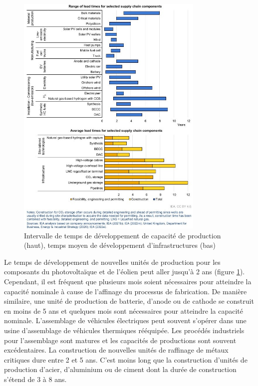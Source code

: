 \begin{figure}[!b]
    \centering
    \includegraphics[width=0.8\textwidth]{Images/supply_chain/time_for_deploying_vis.jpg}
    \caption{Intervalle de temps de développement de capacité de production (haut), temps moyen de développement d'infrastructures (bas)}
    \label{fig:time_supplu}
\end{figure}
Le temps de développement de nouvelles unités de production pour les composants du photovoltaïque et de l'éolien peut aller jusqu'à 2 ans (figure \ref{fig:time_supplu}). Cependant, il est fréquent que plusieurs mois soient nécessaires pour atteindre la capacité nominale à cause de l'affinage du processus de fabrication. De manière similaire, une unité de production de batterie, d'anode ou de cathode se construit en moins de 5 ans et quelques mois sont nécessaires pour atteindre la capacité nominale.\smallbreak
L'assemblage de véhicules électriques peut souvent s'opérer dans une usine d'assemblage de véhicules thermiques rééquipée. Les procédés industriels pour l'assemblage sont matures et les capacités de productions sont souvent excédentaires.\smallbreak
La construction de nouvelles unités de raffinage de métaux critiques dure entre 2 et 5 ans. C'est moins long que la construction d'unités de production d'acier, d'aluminium ou de ciment dont la durée de construction s'étend de 3 à 8 ans.
